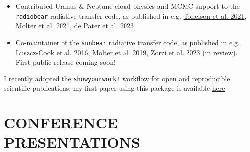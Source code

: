 \documentclass[margin, 10pt]{res} %
\begin{document}
\begin{resume}
\begin{itemize}
\item Contributed Uranus \& Neptune cloud physics and MCMC support to the \texttt{radiobear} radiative transfer code, as published in e.g. \href{https://doi.org/10.3847/PSJ/abf837}{Tollefson et al. 2021}, \href{https://doi.org/10.3847/PSJ/abc48a}{Molter et al. 2021}, \href{https://doi.org/10.3390/rs15051313}{de Pater et al. 2023}

\item Co-maintainer of the \texttt{sunbear} radiative transfer code, as published in e.g. \href{https://doi.org/10.1016/j.icarus.2016.04.032}{Luszcz-Cook et al. 2016}, \href{https://doi.org/10.1016/j.icarus.2018.11.018}{Molter et al. 2019}, Zorzi et al. 2023 (in review). First public release coming soon!

\end{itemize}

I recently adopted the \texttt{showyourwork!} workflow for open and reproducible scientific publications; my first paper using this package is available \href{https://github.com/emolter/mab}{here}



\section{CONFERENCE PRESENTATIONS}


\begin{enumerate}
	

\end{enumerate}
\end{resume}
\end{document}

